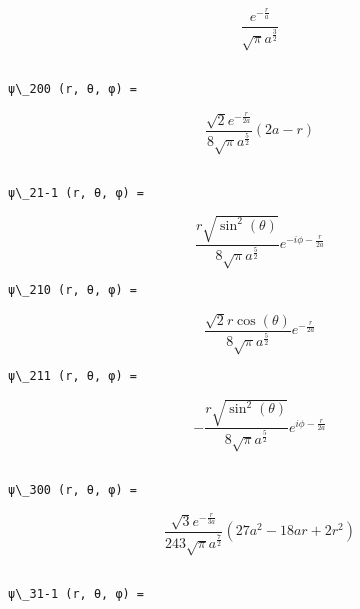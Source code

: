\documentclass[11pt]{article}
\begin{document}
    $$\frac{e^{- \frac{r}{a}}}{\sqrt{\pi} a^{\frac{3}{2}}}$$

    
    \begin{Verbatim}[commandchars=\\\{\}]

ψ\_200 (r, θ, φ) =

    \end{Verbatim}

    $$\frac{\sqrt{2} e^{- \frac{r}{2 a}}}{8 \sqrt{\pi} a^{\frac{5}{2}}} \left(2 a - r\right)$$

    
    \begin{Verbatim}[commandchars=\\\{\}]

ψ\_21-1 (r, θ, φ) =

    \end{Verbatim}

    $$\frac{r \sqrt{\sin^{2}{\left (\theta \right )}}}{8 \sqrt{\pi} a^{\frac{5}{2}}} e^{- i \phi - \frac{r}{2 a}}$$

    
    \begin{Verbatim}[commandchars=\\\{\}]
ψ\_210 (r, θ, φ) =

    \end{Verbatim}

    $$\frac{\sqrt{2} r \cos{\left (\theta \right )}}{8 \sqrt{\pi} a^{\frac{5}{2}}} e^{- \frac{r}{2 a}}$$

    
    \begin{Verbatim}[commandchars=\\\{\}]
ψ\_211 (r, θ, φ) =

    \end{Verbatim}

    $$- \frac{r \sqrt{\sin^{2}{\left (\theta \right )}}}{8 \sqrt{\pi} a^{\frac{5}{2}}} e^{i \phi - \frac{r}{2 a}}$$

    
    \begin{Verbatim}[commandchars=\\\{\}]

ψ\_300 (r, θ, φ) =

    \end{Verbatim}

    $$\frac{\sqrt{3} e^{- \frac{r}{3 a}}}{243 \sqrt{\pi} a^{\frac{7}{2}}} \left(27 a^{2} - 18 a r + 2 r^{2}\right)$$

    
    \begin{Verbatim}[commandchars=\\\{\}]

ψ\_31-1 (r, θ, φ) =

    \end{Verbatim}
\end{document}
